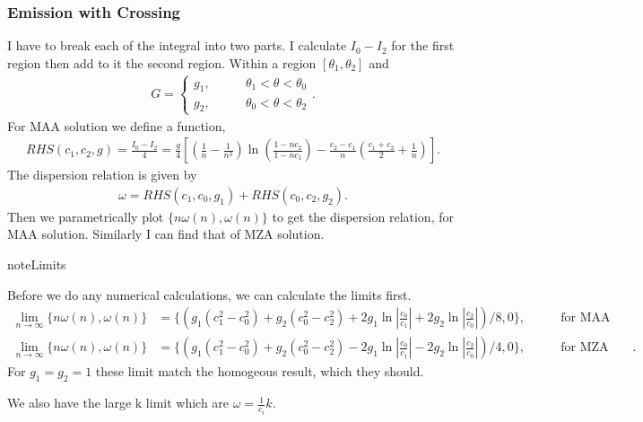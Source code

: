 \documentclass[letterpaper,12pt,english]{sphinxmanual}
\begin{document}
\subsubsection{Emission with Crossing}
\label{\detokenize{collective/dispersion-relation:emission-with-crossing}}
I have to break each of the integral into two parts. I calculate \(I_0-I_2\) for the first region then add to it the second region. Within a region \([\theta_1,\theta_2]\) and
\begin{equation*}
\begin{split}G=\begin{cases}
g_1, \qquad & \theta_1<\theta<\theta_0 \\
g_2, \qquad & \theta_0<\theta<\theta_2
\end{cases}.\end{split}
\end{equation*}
For MAA solution we define a function,
\begin{equation*}
\begin{split}RHS(c_1,c_2,g)=\frac{I_0-I_2}{4} = \frac{g}{4} \left[ \left( \frac{1}{n} - \frac{1}{n^3} \right)\ln\left( \frac{1-n c_2}{1-n c_1} \right) - \frac{c_2-c_1}{n} \left( \frac{c_1+c_2}{2} + \frac{1}{n} \right) \right].\end{split}
\end{equation*}
The dispersion relation is given by
\begin{equation*}
\begin{split}\omega = RHS(c_1,c_0,g_1) + RHS(c_0,c_2,g_2).\end{split}
\end{equation*}
Then we parametrically plot \(\{ n \omega(n), \omega(n)\}\) to get the dispersion relation, for MAA solution. Similarly I can find that of MZA solution.

\begin{sphinxadmonition}{note}{Limits}

Before we do any numerical calculations, we can calculate the limits first.
\begin{equation*}
\begin{split}\lim_{n\to\infty}\{n\omega(n),\omega(n)\}  &= \{( g_1(c_1^2-c_0^2) + g_2(c_0^2-c_2^2) + 2 g_1 \ln \left\vert\frac{c_0}{c_1}\right\vert + 2 g_2\ln \left\vert\frac{c_2}{c_0}\right\vert )/8, 0  \}, &\qquad \text{for MAA solution} \\
\lim_{n\to\infty}\{n\omega(n),\omega(n)\}  &= \{ ( g_1(c_1^2-c_0^2) + g_2(c_0^2-c_2^2) - 2 g_1 \ln \left\vert\frac{c_0}{c_1}\right\vert - 2 g_2\ln \left\vert\frac{c_2}{c_0}\right\vert )/4, 0  \}, &\qquad \text{for MZA solution}.\end{split}
\end{equation*}
For \(g_1=g_2=1\) these limit match the homogeous result, which they should.

We also have the large k limit which are \(\omega = \frac{1}{c_i}k\).
\end{sphinxadmonition}
\end{document}

